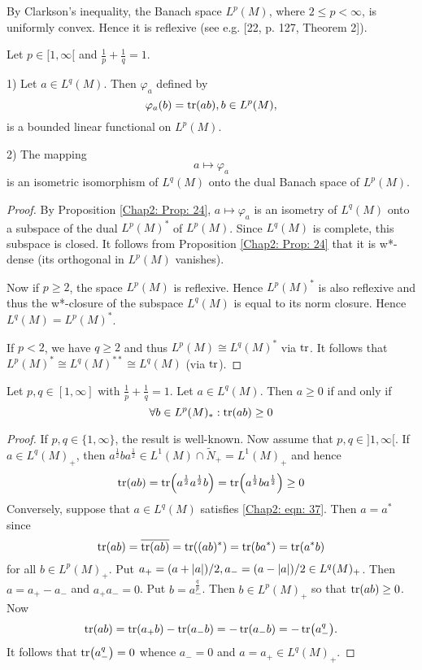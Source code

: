 By Clarkson's inequality, the Banach space $L^p(M)$, where $2\leq p<\infty$, is uniformly convex. Hence it is reflexive (see e.g. [22, p. 127, Theorem 2]).
\begin{theorem}
    Let $p\in [1,\infty[$ and $\frac{1}{p} + \frac{1}{q}=1$.\par
    1) Let $a\in L^q(M)$. Then $\varphi_a$ defined by
    \[
        \varphi_a(b)=\tr(ab),b\in L^p(M),
    \]
    is a bounded linear functional on $L^p(M)$.\par
    2) The mapping
    \[
        a\mapsto \varphi_a
    \]
    is an isometric isomorphism of $L^q(M)$ onto the dual Banach space of $L^p(M)$.
\end{theorem}
\begin{proof}
    By Proposition \ref{Chap2: Prop: 24}, $a\mapsto \varphi_a$ is an isometry of $L^q(M)$ onto a subspace of the dual $L^p(M)^*$ of $L^p(M)$. Since $L^q(M)$ is complete, this subspace is closed. It follows from Proposition \ref{Chap2: Prop: 24} that it is w*-dense (its orthogonal in $L^p(M)$ vanishes).\par
    Now if $p\geq 2$, the space $L^p(M)$ is reflexive. Hence $L^p(M)^*$ is also reflexive and thus the w*-closure of the subspace $L^q(M)$ is equal to its norm closure. Hence $L^q(M)=L^p(M)^*$.\par
    If $p<2$, we have $q\geq 2$ and thus $L^p(M)\cong L^q(M)^*$ via $\tr$. It follows that $L^p(M)^*\cong L^q(M)^{**}\cong L^q(M)$ (via $\tr$).
\end{proof}
\begin{proposition}
    Let $p,q\in [1,\infty]$ with $\frac{1}{p}+\frac{1}{q}=1$. Let $a\in L^q(M)$. Then $a\geq 0$ if and only if
    \begin{equation}\label{Chap2: eqn: 37}
        \forall b\in L^p(M)_*:\tr(ab)\geq 0
    \end{equation}
\end{proposition}
\begin{proof}
    If $p,q\in \{1,\infty\}$, the result is well-known. Now assume that $p,q\in ]1,\infty[$. If $a\in L^q(M)_+$, then $a^\frac{1}{2}ba^\frac{1}{2}\in L^1(M)\cap \tilde{N}_+=L^1(M)_+$ and hence
    \[
        \tr(ab)=\tr(a^\frac{1}{2}a^\frac{1}{2}b)=\tr(a^\frac{1}{2}ba^\frac{1}{2})\geq 0
    \]
    Conversely, suppose that $a\in L^q(M)$ satisfies \eqref{Chap2: eqn: 37}. Then $a=a^*$ since
    \[
        \tr(ab)=\overline{\tr(ab)}=\tr((ab)^*)=\tr(ba^*)=\tr(a^*b)
    \]
    for all $b\in L^p(M)_+$. Put $a_+=(a+\abs{a})/2, a_-=(a-\abs{a})/2\in L^q(M)_+$. Then $a = a_+ - a_-$ and $a_+ a_- = 0$. Put $b=a_-^\frac{q}{p}$. Then $b\in L^p(M)_+$ so that $\tr(ab)\geq 0$. Now
    \[
        \tr(ab)=\tr(a_+b)-\tr(a_-b)=-\tr(a_-b)=-\tr(a_-^q).
    \]
    It follows that $\tr(a_-^q)=0$ whence $a_-= 0$ and $a = a_+\in L^q(M)_+$.
\end{proof}

